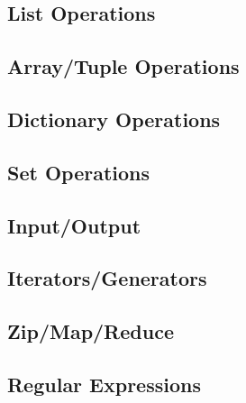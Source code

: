 \documentclass[a4paper,11pt]{article}
\begin{document}
\subsection{List Operations}

\subsection{Array/Tuple Operations}

\subsection{Dictionary Operations}

\subsection{Set Operations}

\subsection{Input/Output}

\subsection{Iterators/Generators}

\subsection{Zip/Map/Reduce}

\subsection{Regular Expressions}
\end{document}
